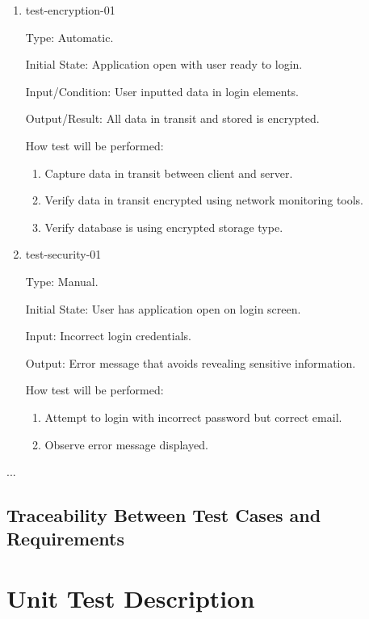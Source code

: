 \documentclass[12pt, titlepage]{article}
\begin{document}
\begin{enumerate}

\item{test-encryption-01\\}

Type: Automatic.
					
Initial State: Application open with user ready to login.
					
Input/Condition: User inputted data in login elements.
					
Output/Result: All data in transit and stored is encrypted.
					
How test will be performed: 
\begin{enumerate}[1.]
	\item Capture data in transit between client and server.
	\item Verify data in transit encrypted using network monitoring tools.
	\item Verify database is using encrypted storage type.
\end{enumerate}
					
\item{test-security-01\\}

Type: Manual.
					
Initial State: User has application open on login screen.
					
Input: Incorrect login credentials.
					
Output: Error message that avoids revealing sensitive information.
					
How test will be performed: 
\begin{enumerate}[1.]
	\item Attempt to login with incorrect password but correct email.
	\item Observe error message displayed.
\end{enumerate}
\end{enumerate}

...

\subsection{Traceability Between Test Cases and Requirements}


\section{Unit Test Description}
\label{section:unitTests}
\end{document}
